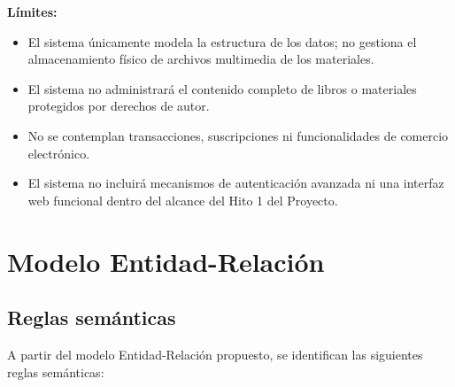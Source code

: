 \documentclass[12pt,a4paper]{article}
\begin{document}
\textbf{Límites:}
\begin{itemize}
    \item El sistema únicamente modela la estructura de los datos; no gestiona el almacenamiento físico de archivos multimedia de los materiales.
    \item El sistema no administrará el contenido completo de libros o materiales protegidos por derechos de autor.
    \item No se contemplan transacciones, suscripciones ni funcionalidades de comercio electrónico.
    \item El sistema no incluirá mecanismos de autenticación avanzada ni una interfaz web funcional dentro del alcance del Hito 1 del Proyecto.
\end{itemize}


\section{Modelo Entidad-Relación}

\subsection{Reglas semánticas}

A partir del modelo Entidad-Relación propuesto, se identifican las siguientes reglas semánticas:
\end{document}
